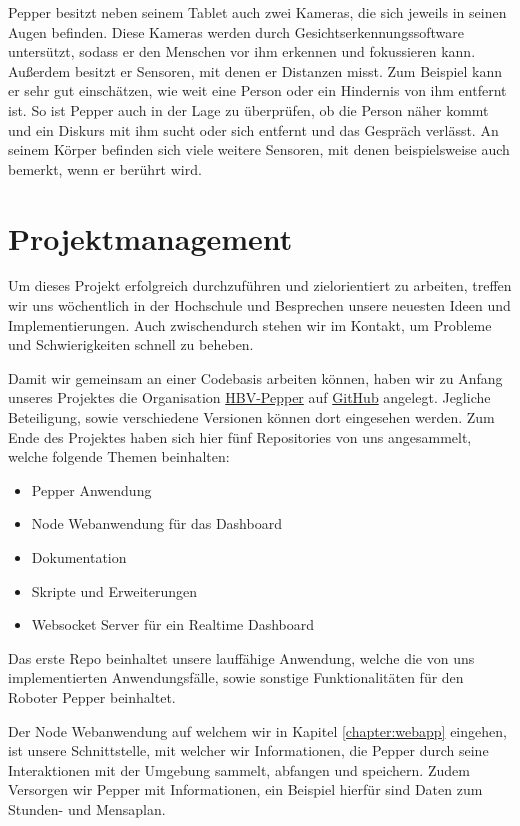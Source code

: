 Pepper besitzt neben seinem Tablet auch zwei Kameras, die sich jeweils in seinen Augen befinden. Diese Kameras werden durch Gesichtserkennungssoftware untersützt, sodass er den Menschen vor ihm erkennen und fokussieren kann. Außerdem besitzt er Sensoren, mit denen er Distanzen misst. Zum Beispiel kann er sehr gut einschätzen, wie weit eine Person oder ein Hindernis von ihm entfernt ist. So ist Pepper auch in der Lage zu überprüfen, ob die Person näher kommt und ein Diskurs mit ihm sucht oder sich entfernt und das Gespräch verlässt. An seinem Körper befinden sich viele weitere Sensoren, mit denen beispielsweise auch bemerkt, wenn er berührt wird.\\


\section{Projektmanagement}
Um dieses Projekt erfolgreich durchzuführen und zielorientiert zu arbeiten, treffen wir uns wöchentlich
in der Hochschule und Besprechen unsere neuesten Ideen und Implementierungen. Auch zwischendurch
stehen wir im Kontakt, um Probleme und Schwierigkeiten schnell zu beheben.

Damit wir gemeinsam an einer Codebasis arbeiten können, haben wir zu Anfang unseres Projektes
die Organisation \href{https://github.com/ProjectPepperHSB}{HBV-Pepper} auf
\href{https://github.com}{GitHub} angelegt. Jegliche Beteiligung, sowie verschiedene Versionen können dort eingesehen werden.
Zum Ende des Projektes haben sich hier fünf Repositories von uns angesammelt, welche folgende Themen beinhalten:

\begin{itemize}
    \item Pepper Anwendung
    \item Node Webanwendung für das Dashboard
    \item Dokumentation
    \item Skripte und Erweiterungen
    \item Websocket Server für ein Realtime Dashboard
\end{itemize}

Das erste Repo beinhaltet unsere lauffähige Anwendung, welche die von uns
implementierten Anwendungsfälle, sowie sonstige Funktionalitäten für den Roboter Pepper beinhaltet.

Der Node Webanwendung auf welchem wir in Kapitel \ref{chapter:webapp} eingehen, ist unsere Schnittstelle, mit welcher wir Informationen, die Pepper durch seine Interaktionen mit der Umgebung sammelt, abfangen und speichern. Zudem Versorgen wir Pepper mit Informationen, ein Beispiel hierfür sind Daten zum Stunden- und Mensaplan.

